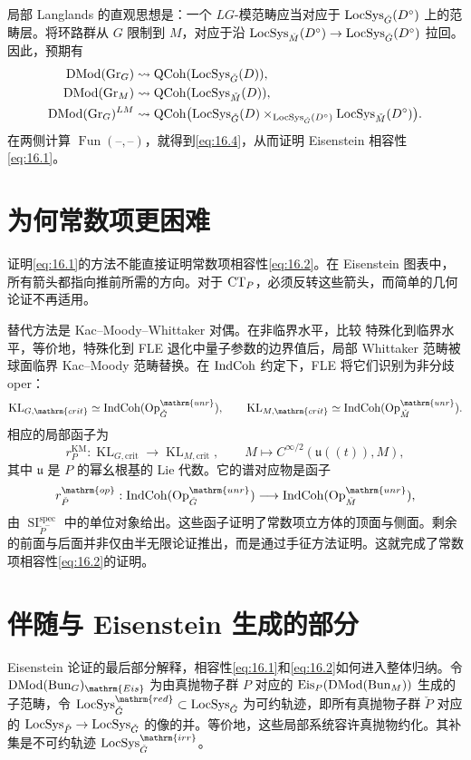 局部 Langlands 的直观思想是：一个 $LG$-模范畴应当对应于 $\operatorname{LocSys}_{\check{G}}(D^\circ)$ 上的范畴层。将环路群从 $G$ 限制到 $M$，对应于沿 $\operatorname{LocSys}_{\check M}(D^\circ)\to\operatorname{LocSys}_{\check{G}}(D^\circ)$ 拉回。因此，预期有
\[\begin{aligned}
\operatorname{DMod}(\operatorname{Gr}_G)&\rightsquigarrow\operatorname{QCoh}(\operatorname{LocSys}_{\check{G}}(D)),\\
\operatorname{DMod}(\operatorname{Gr}_M)&\rightsquigarrow\operatorname{QCoh}(\operatorname{LocSys}_{\check M}(D)),\\
\operatorname{DMod}(\operatorname{Gr}_G)^{LM}&\rightsquigarrow\operatorname{QCoh}\bigl(\operatorname{LocSys}_{\check{G}}(D)\times_{\operatorname{LocSys}_{\check{G}}(D^\circ)}\operatorname{LocSys}_{\check M}(D^\circ)\bigr).
\end{aligned}\]
在两侧计算 $\operatorname{Fun}(\text{--},\text{--})$，就得到\eqref{eq:16.4}，从而证明 Eisenstein 相容性\eqref{eq:16.1}。

\section{为何常数项更困难}\label{sec:16.5}
证明\eqref{eq:16.1}的方法不能直接证明常数项相容性\eqref{eq:16.2}。在 Eisenstein 图表中，所有箭头都指向推前所需的方向。对于 $\operatorname{CT}_P$，必须反转这些箭头，而简单的几何论证不再适用。

替代方法是 Kac–Moody–Whittaker 对偶。在非临界水平，比较
特殊化到临界水平，等价地，特殊化到 FLE 退化中量子参数的边界值后，局部 Whittaker 范畴被球面临界 Kac–Moody 范畴替换。在 $\operatorname{IndCoh}$ 约定下，FLE 将它们识别为非分歧 oper：
\[\operatorname{KL}_{G,\mathrm{crit}}\simeq\IndCoh(\Op^{\mathrm{unr}}_{\checkG}),\qquad
\operatorname{KL}_{M,\mathrm{crit}}\simeq\IndCoh(\Op^{\mathrm{unr}}_{\check M}).\]
相应的局部函子为
\[r_P^{\mathrm{KM}}:\operatorname{KL}_{G,\mathrm{crit}}\longrightarrow\operatorname{KL}_{M,\mathrm{crit}},\qquad
M\longmapsto C^{\infty/2}(\mathfrak u((t)),M),\]
其中 $\mathfrak u$ 是 $P$ 的幂幺根基的 Lie 代数。它的谱对应物是函子
\[r_{\check P}^{\mathrm{op}}:\IndCoh(\Op^{\mathrm{unr}}_{\checkG})\longrightarrow\IndCoh(\Op^{\mathrm{unr}}_{\check M}),\]
由 $\operatorname{SI}_{\check P^-}^{\mathrm{spec}}$ 中的单位对象给出。这些函子证明了常数项立方体的顶面与侧面\cite{CCF24}。剩余的前面与后面并非仅由半无限论证推出，而是通过手征方法证明。这就完成了常数项相容性\eqref{eq:16.2}的证明。

\section{伴随与 Eisenstein 生成的部分}\label{sec:16.6}
Eisenstein 论证的最后部分解释，相容性\eqref{eq:16.1}和\eqref{eq:16.2}如何进入整体归纳。令 $\DMod(\Bun_G)_{\mathrm{Eis}}$ 为由真抛物子群 $P$ 对应的 $\operatorname{Eis}_P(\operatorname{DMod}(\operatorname{Bun}_M))$ 生成的子范畴，令 $\LocSys^{\mathrm{red}}_{\checkG}\subset\LocSys_{\checkG}$ 为可约轨迹，即所有真抛物子群 $\check P$ 对应的 $\operatorname{LocSys}_{\check P}\to\operatorname{LocSys}_{\check{G}}$ 的像的并。等价地，这些局部系统容许真抛物约化。其补集是不可约轨迹 $\LocSys^{\mathrm{irr}}_{\checkG}$。

